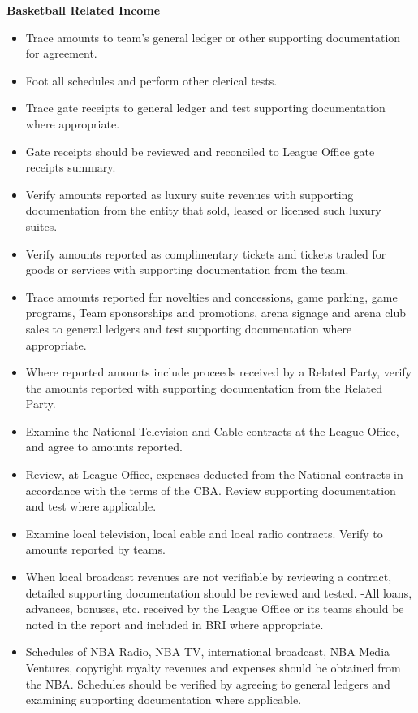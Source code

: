 \documentclass[
]{book}
\providecommand{\tightlist}{%
  \setlength{\itemsep}{0pt}\setlength{\parskip}{0pt}}
\begin{document}
\textbf{Basketball Related Income}

\begin{itemize}
\tightlist
\item
  Trace amounts to team's general ledger or other supporting documentation for agreement.
\item
  Foot all schedules and perform other clerical tests.
\item
  Trace gate receipts to general ledger and test supporting documentation where appropriate.
\item
  Gate receipts should be reviewed and reconciled to League Office gate receipts summary.
\item
  Verify amounts reported as luxury suite revenues with supporting documentation from the entity that sold, leased or licensed such luxury suites.
\item
  Verify amounts reported as complimentary tickets and tickets traded for goods or services with supporting documentation from the team.
\item
  Trace amounts reported for novelties and concessions, game parking, game programs, Team sponsorships and promotions, arena signage and arena club sales to general ledgers and test supporting documentation where appropriate.
\item
  Where reported amounts include proceeds received by a Related Party, verify the amounts reported with supporting documentation from the Related Party.
\item
  Examine the National Television and Cable contracts at the League Office, and agree to amounts reported.
\item
  Review, at League Office, expenses deducted from the National contracts in accordance with the terms of the CBA. Review supporting documentation and test where applicable.
\item
  Examine local television, local cable and local radio contracts. Verify to amounts reported by teams.
\item
  When local broadcast revenues are not verifiable by reviewing a contract, detailed supporting documentation should be reviewed and tested.
  -All loans, advances, bonuses, etc. received by the League Office or its teams should be noted in the report and included in BRI where appropriate.
\item
  Schedules of NBA Radio, NBA TV, international broadcast, NBA Media Ventures, copyright royalty revenues and expenses should be obtained from the NBA. Schedules should be verified by agreeing to general ledgers and examining supporting documentation where applicable.

\end{itemize}
\end{document}
